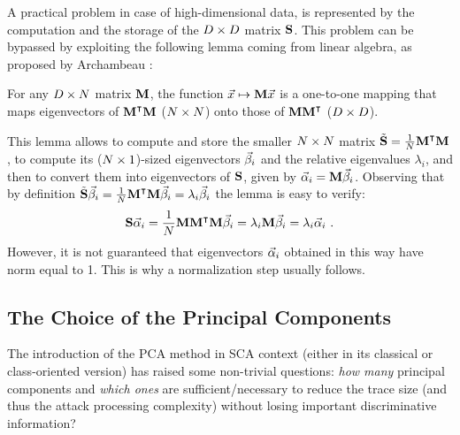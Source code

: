A practical problem in case of high-dimensional data, is represented by the computation and the storage of the $D\times D$ matrix $\textbf{S}$. This problem can be bypassed by exploiting the following lemma coming from linear algebra, as proposed by Archambeau \etal \cite{TAprincipal}:
\begin{lemma}
For any $D\times N$ matrix $\textbf{M}$, the function $\vec{x}\mapsto \textbf{M}\vec{x}$ is a one-to-one mapping that maps eigenvectors of $\textbf{M}^\intercal\textbf{M}$ ($N\times N$) onto those of $\textbf{M}\textbf{M}^\intercal$ ($D\times D$).
\end{lemma}
This lemma allows to compute and store the smaller $N\times N$ matrix $\tilde{\textbf{S}} = \frac{1}{N}\textbf{M}^\intercal\textbf{M}$, to compute its ($N\times 1$)-sized eigenvectors $\vec{\beta}_i$ and the relative eigenvalues $\lambda_i$, and then to convert them into eigenvectors of $\textbf{S}$, given by $\vec{\alpha}_i =\textbf{M} \vec{\beta}_i$. Observing that by definition $\tilde{\textbf{S}}\vec{\beta}_i =\frac{1}{N}\textbf{M}^\intercal\textbf{M}\vec{\beta}_i =  \lambda_i\vec{\beta}_i$ the lemma is easy to verify: 
\begin{equation}
\textbf{S}\vec{\alpha}_i = \frac{1}{N}\textbf{M}\textbf{M}^\intercal \textbf{M} \vec{\beta}_i = \lambda_i\textbf{M}\vec{\beta}_i = \lambda_i\vec{\alpha}_i \mbox{ .}
\end{equation}
However, it is not guaranteed that eigenvectors $\vec{\alpha}_i$ obtained in this way have norm equal to 1. This is why a normalization step usually follows.



\subsection{The Choice of the Principal Components}\label{sec:ELV}
The introduction of the PCA method in SCA context (either in its classical or class-oriented version)  has raised some non-trivial questions: \textit{how many} principal components and \textit{which ones} are sufficient/necessary to reduce the trace size (and thus the attack processing complexity) without losing important discriminative information?\\

